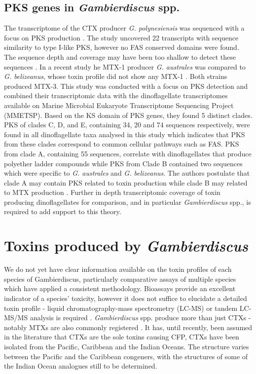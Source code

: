 \documentclass[12pt]{article}
\begin{document}
\subsection{PKS genes in \emph{Gambierdiscus} spp.}
The transcriptome of the CTX producer \emph{G. polynesiensis} was sequenced with a focus on PKS production \cite{pawlowiez2014transcriptome}. The study uncovered 22 transcripts with sequence similarity to type I-like PKS, however no FAS conserved domains were found. The sequence depth and coverage may have been too shallow to detect these sequences \cite{kohli2015polyketide}.
In a recent study he MTX-1 producer \emph{G. australes} was compared to \emph{G. belizeanus}, whose toxin profile did not show any MTX-1 \cite{kohli2015polyketide}. Both strains produced MTX-3. This study was conducted with a focus on PKS detection and combined their transcriptomic data with the dinoflagellate transcriptomes available on Marine Microbial Eukaryote Transcriptome Sequencing Project (MMETSP). Based on the KS domain of PKS genes, they found 5 distinct clades. PKS of clades C, D, and E, containing 34, 20 and 74 sequences respectively, were found in all dinoflagellate taxa analysed in this study which indicates that PKS from these clades correspond to common cellular pathways such as FAS. PKS from clade A, containing 55 sequences, correlate with dinoflagellates that produce polyether ladder compounds while PKS from Clade B contained two sequences which were specific to \emph{G. australes} and \emph{G. belizeanus}. The authors postulate that clade A may contain PKS related to toxin production while clade B may related to MTX production \cite{kohli2015polyketide}. Further in depth transcriptomic coverage of toxin producing dinoflagellates for comparison, and in particular \emph{Gambierdiscus} spp., is required to add support to this theory.

\section{Toxins produced by \emph{Gambierdiscus}}

We do not yet have clear information available on the toxin profiles of each species of Gambierdiscus, particularly comparative assays of multiple species which have applied a consistent methodology. Bioassays provide an excellent indicator of a species' toxicity, however it does not suffice to elucidate a detailed toxin profile - liquid chromatography-mass spectrometry (LC-MS) or tandem LC-MS/MS analysis is required \cite{diogened2014chemistry}. \emph{Gambierdiscus} spp. produce more than just CTXs - notably MTXs are also commonly registered \cite{holmes1994purification,murata1993structure}. It has, until recently, been assumed in the literature that CTXs are the sole toxins causing CFP, CTXs have been isolated from the Pacific, Caribbean and the Indian Oceans. The  structure varies between the Pacific and the Caribbean congeners, with the structures of some of the Indian Ocean analogues still to be determined. \\
\end{document}
